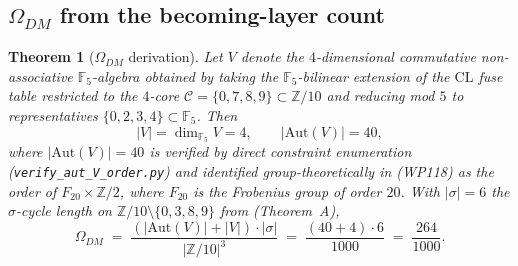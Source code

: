 \documentclass[11pt,reqno]{amsart}
\theoremstyle{plain}
\newtheorem{theorem}{Theorem}[section]
\theoremstyle{definition}
\theoremstyle{remark}
\newcommand{\Z}{\mathbb{Z}}
\newcommand{\F}{\mathbb{F}}
\newcommand{\Aut}{\mathrm{Aut}}
\begin{document}
\subsection{$\Omega_{DM}$ from the becoming-layer count}

\begin{theorem}[$\Omega_{DM}$ derivation]\label{thm:omega-dm-deriv}
Let $V$ denote the $4$-dimensional commutative non-associative
$\F_5$-algebra obtained by taking the $\F_5$-bilinear extension of
the $\mathrm{CL}$ fuse table restricted to the $4$-core
$\mathcal{C} = \{0, 7, 8, 9\} \subset \Z/10$ and reducing mod $5$
to representatives $\{0, 2, 3, 4\} \subset \F_5$. Then
\[
  |V| = \dim_{\F_5} V = 4,\qquad |\Aut(V)| = 40,
\]
where $|\Aut(V)| = 40$ is verified by direct constraint enumeration
(\texttt{verify\_aut\_V\_order.py}) and identified group-theoretically
in \cite{SandersClaudeChat2026BridgeSprint} (WP118) as the order of
$F_{20} \times \Z/2$, where $F_{20}$ is the Frobenius group of
order $20$. With $|\sigma| = 6$ the $\sigma$-cycle length on
$\Z/10 \setminus \{0, 3, 8, 9\}$ from
\cite{SandersGish2026SigmaRate} (Theorem~A),
\[
  \Omega_{DM}
  \;=\; \frac{(|\Aut(V)| + |V|) \cdot |\sigma|}{|\Z/10|^{3}}
  \;=\; \frac{(40 + 4) \cdot 6}{1000}
  \;=\; \frac{264}{1000}.
\]
\end{theorem}

\end{document}

